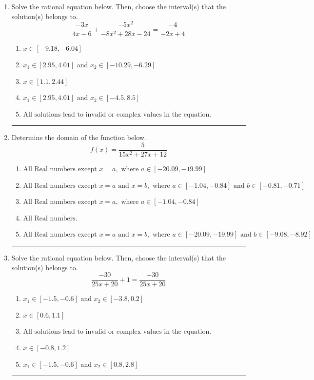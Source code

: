 \documentclass[14pt]{extbook}
\newcommand{\litem}[1]{\item#1\hspace*{-1cm}\rule{\textwidth}{0.4pt}}
\begin{document}
\begin{enumerate}
\litem{
Solve the rational equation below. Then, choose the interval(s) that the solution(s) belongs to.\[ \frac{-3x}{4x -6} + \frac{-5x^{2}}{-8x^{2} +28 x -24} = \frac{-4}{-2x + 4} \]\begin{enumerate}[label=\Alph*.]
\item \( x \in [-9.18,-6.04] \)
\item \( x_1 \in [2.95, 4.01] \text{ and } x_2 \in [-10.29,-6.29] \)
\item \( x \in [1.1,2.44] \)
\item \( x_1 \in [2.95, 4.01] \text{ and } x_2 \in [-4.5,8.5] \)
\item \( \text{All solutions lead to invalid or complex values in the equation.} \)

\end{enumerate} }
\litem{
Determine the domain of the function below.\[ f(x) = \frac{5}{15x^{2} +27 x + 12} \]\begin{enumerate}[label=\Alph*.]
\item \( \text{All Real numbers except } x = a, \text{ where } a \in [-20.09, -19.99] \)
\item \( \text{All Real numbers except } x = a \text{ and } x = b, \text{ where } a \in [-1.04, -0.84] \text{ and } b \in [-0.81, -0.71] \)
\item \( \text{All Real numbers except } x = a, \text{ where } a \in [-1.04, -0.84] \)
\item \( \text{All Real numbers.} \)
\item \( \text{All Real numbers except } x = a \text{ and } x = b, \text{ where } a \in [-20.09, -19.99] \text{ and } b \in [-9.08, -8.92] \)

\end{enumerate} }
\litem{
Solve the rational equation below. Then, choose the interval(s) that the solution(s) belongs to.\[ \frac{-30}{25x + 20} + 1 = \frac{-30}{25x + 20} \]\begin{enumerate}[label=\Alph*.]
\item \( x_1 \in [-1.5, -0.6] \text{ and } x_2 \in [-3.8,0.2] \)
\item \( x \in [0.6,1.1] \)
\item \( \text{All solutions lead to invalid or complex values in the equation.} \)
\item \( x \in [-0.8,1.2] \)
\item \( x_1 \in [-1.5, -0.6] \text{ and } x_2 \in [0.8,2.8] \)


\end{enumerate}}
\end{enumerate}
\end{document}
